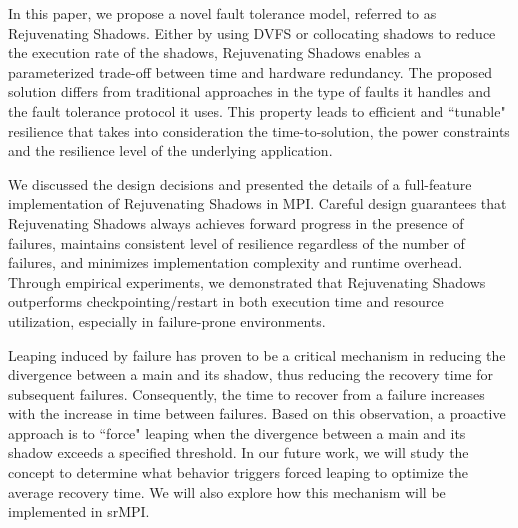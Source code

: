
In this paper, we propose a novel fault tolerance model, referred to as Rejuvenating Shadows. %
Either by using DVFS or collocating shadows to reduce the execution rate of the shadows, 
Rejuvenating Shadows enables a parameterized trade-off between time and hardware redundancy. The proposed solution differs from traditional approaches in the type of faults it handles and the fault tolerance protocol it uses.  %
This property leads to efficient and ``tunable" resilience that takes into consideration the time-to-solution, the power constraints and the resilience level of the underlying application.%

We discussed the design decisions and presented the details of a full-feature implementation of Rejuvenating Shadows in MPI. Careful design guarantees that Rejuvenating Shadows always achieves forward progress in the presence of failures, maintains consistent level of resilience regardless of the number of failures, and minimizes implementation complexity and runtime overhead. Through empirical experiments, we demonstrated that Rejuvenating Shadows outperforms checkpointing/restart in both execution time and resource utilization, especially in failure-prone environments.

Leaping induced by failure has proven to be a critical mechanism in reducing the divergence between a main and its shadow, 
thus reducing the recovery time for subsequent failures. Consequently, the time to recover from a failure increases with the increase in time between failures.  
Based on this observation, a proactive approach is to ``force" leaping when the divergence between a main and its shadow exceeds a specified threshold. 
In our future work, we will study the concept to determine what behavior triggers forced leaping to optimize the average recovery time. We will also explore how this mechanism will be implemented in srMPI.


